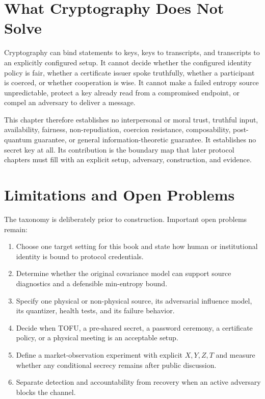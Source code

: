 \section{What Cryptography Does Not Solve}

Cryptography can bind statements to keys, keys to transcripts, and transcripts
to an explicitly configured setup.  It cannot decide whether the configured
identity policy is fair, whether a certificate issuer spoke truthfully,
whether a participant is coerced, or whether cooperation is wise.  It cannot
make a failed entropy source unpredictable, protect a key already read from a
compromised endpoint, or compel an adversary to deliver a message.

This chapter therefore establishes no interpersonal or moral trust, truthful
input, availability, fairness, non-repudiation, coercion resistance,
composability, post-quantum guarantee, or general information-theoretic
guarantee.  It establishes no secret key at all.  Its contribution is the
boundary map that later protocol chapters must fill with an explicit setup,
adversary, construction, and evidence.

\section{Limitations and Open Problems}

The taxonomy is deliberately prior to construction.  Important open problems
remain:

\begin{enumerate}
    \item Choose one target setting for this book and state how human or
    institutional identity is bound to protocol credentials.
    \item Determine whether the original covariance model can support source
    diagnostics and a defensible min-entropy bound.
    \item Specify one physical or non-physical source, its adversarial influence
    model, its quantizer, health tests, and its failure behavior.
    \item Decide when TOFU, a pre-shared secret, a password ceremony, a
    certificate policy, or a physical meeting is an acceptable setup.
    \item Define a market-observation experiment with explicit $X,Y,Z,T$ and
    measure whether any conditional secrecy remains after public discussion.
    \item Separate detection and accountability from recovery when an active
    adversary blocks the channel.
\end{enumerate}

